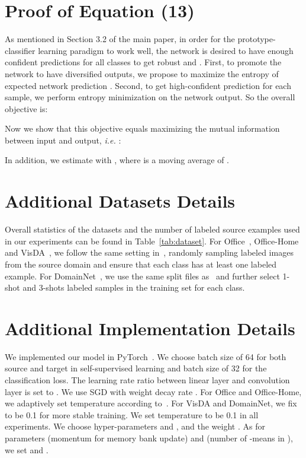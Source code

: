 \documentclass[final]{cvpr}
\begin{document}
\section{Proof of Equation (13)}



As mentioned in Section 3.2 of the main paper, in order for the prototype-classifier learning paradigm to work well, the network is desired to have enough confident predictions for all classes to get robust  and . First, to promote the network to have diversified outputs, we propose to maximize the entropy of expected network prediction . Second, to get high-confident prediction for each sample, we perform entropy minimization on the network output. So the overall objective is: 

Now we show that this objective equals maximizing the mutual information between input and output, \textit{i.e.} :
{\allowdisplaybreaks

}
In addition, we estimate  with , where  is a moving average of . 





\section{Additional Datasets Details}

Overall statistics of the datasets and the number of labeled source examples used in our experiments can be found in Table~\ref{tab:dataset}. For Office~\cite{saenko2010adapting}, Office-Home~\cite{venkateswara2017deep} and VisDA~\cite{peng2017visda}, we follow the same setting in~\cite{kim2020cross}, randomly sampling labeled images from the source domain and ensure that each class has at least one labeled example. 
For DomainNet~\cite{peng2019moment}, we use the same split files as~\cite{saito2019semi} and further select 1-shot and 3-shots labeled samples in the training set for each class.



\section{Additional Implementation Details}

We implemented our model in PyTorch~\cite{paszke2019pytorch}. We choose batch size of  64 for both source and target in self-supervised learning and batch size of 32 for the classification loss. The learning rate ratio between linear layer and convolution layer is set to . We use SGD with weight decay rate . For Office and Office-Home, we adaptively set temperature  according to~\cite{li2020prototypical}. For VisDA and DomainNet, we fix  to be 0.1 for more stable training. We set temperature  to be 0.1 in all experiments. 
We choose hyper-parameters  and , and the weight .
As for parameters  (momentum for memory bank update) and  (number of -means in ), we set  and . 
\end{document}
